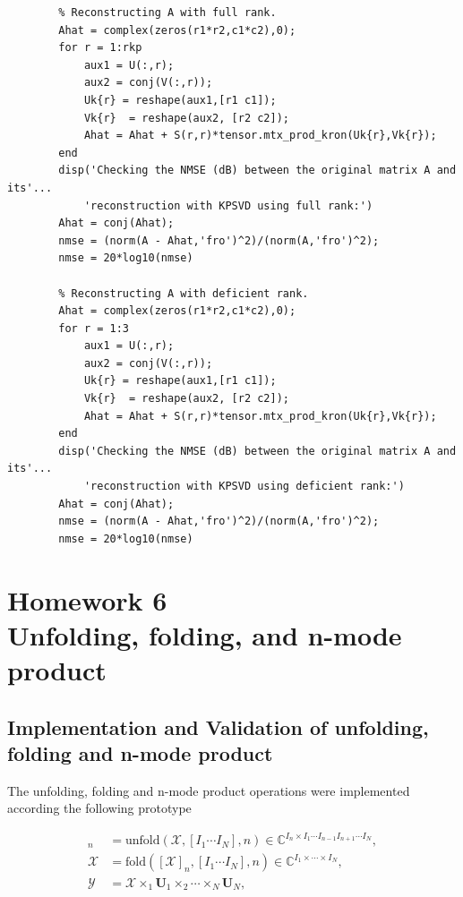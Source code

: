 \documentclass[a4paper,10pt]{article}
\begin{document}
\begin{verbatim}
        % Reconstructing A with full rank.
        Ahat = complex(zeros(r1*r2,c1*c2),0);
        for r = 1:rkp
            aux1 = U(:,r);
            aux2 = conj(V(:,r));
            Uk{r} = reshape(aux1,[r1 c1]);
            Vk{r}  = reshape(aux2, [r2 c2]); 
            Ahat = Ahat + S(r,r)*tensor.mtx_prod_kron(Uk{r},Vk{r});
        end 
        disp('Checking the NMSE (dB) between the original matrix A and its'... 
            'reconstruction with KPSVD using full rank:')
        Ahat = conj(Ahat);
        nmse = (norm(A - Ahat,'fro')^2)/(norm(A,'fro')^2);
        nmse = 20*log10(nmse)

        % Reconstructing A with deficient rank.
        Ahat = complex(zeros(r1*r2,c1*c2),0);
        for r = 1:3
            aux1 = U(:,r);
            aux2 = conj(V(:,r));
            Uk{r} = reshape(aux1,[r1 c1]);
            Vk{r}  = reshape(aux2, [r2 c2]); 
            Ahat = Ahat + S(r,r)*tensor.mtx_prod_kron(Uk{r},Vk{r});
        end  
        disp('Checking the NMSE (dB) between the original matrix A and its'...
            'reconstruction with KPSVD using deficient rank:')
        Ahat = conj(Ahat);
        nmse = (norm(A - Ahat,'fro')^2)/(norm(A,'fro')^2);
        nmse = 20*log10(nmse)
    \end{verbatim}
    
\newpage
\section*{Homework 6 \\ Unfolding, folding, and n-mode product}

    \subsection*{Implementation and Validation of unfolding, folding and n-mode product}

    The unfolding, folding and n-mode product operations were implemented according the following prototype

    \begin{align}
        [\mathcal{X}]_{n} &= \text{unfold}(\mathcal{X}, [I_{1} \cdots I_{N} ], n) \in \mathbb{C}^{I_{n} \times I_{1} \cdots I_{n-1} I_{n+1} \cdots I_{N}}, \\
        \mathcal{X} &= \text{fold}([\mathcal{X}]_{n}, [I_{1} \cdots I_{N} ], n) \in \mathbb{C}^{I_{1} \times \cdots \times I_{N}}, \\
        \mathcal{Y} &= \mathcal{X} \times_{1} \boldsymbol{U}_{1} \times_{2} \cdots \times_{N} \boldsymbol{U}_{N},
    \end{align}
\end{document}
